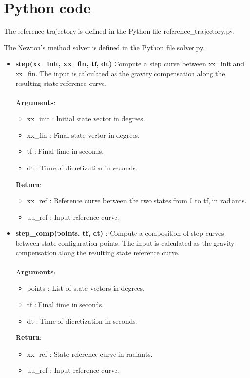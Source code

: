 \section*{Python code}
The reference trajectory is defined in the Python file reference\_trajectory.py.

The Newton's method solver is defined in the Python file solver.py.

\begin{itemize}
    \item \textbf{step(xx\_init, xx\_fin, tf, dt) }Compute a step curve between xx\_init and xx\_fin. The input is calculated as the gravity compensation along the resulting state reference curve.\\\\
    \textbf{Arguments}:
    \begin{itemize}
        \item xx\_init : Initial state vector in degrees.
        \item xx\_fin : Final state vector in degrees.
        \item tf : Final time in seconds.
        \item dt : Time of dicretization in seconds.
    \end{itemize}
    \textbf{Return}:
    \begin{itemize}
        \item xx\_ref : Reference curve between the two states from 0 to tf, in radiants.
        \item uu\_ref : Input reference curve.
    \end{itemize}
    
    \item \textbf{step\_comp(points, tf, dt) }: Compute a composition of step curves between state configuration points. The input is calculated as the gravity compensation along the resulting state reference curve.\\\\
    \textbf{Arguments}:
    \begin{itemize}
        \item points : List of state vectors in degrees.
        \item tf : Final time in seconds.
        \item dt : Time of dicretization in seconds.
    \end{itemize}
    \textbf{Return}:
    \begin{itemize}
        \item xx\_ref : State reference curve in radiants.
        \item uu\_ref : Input reference curve.
    \end{itemize}


\end{itemize}
